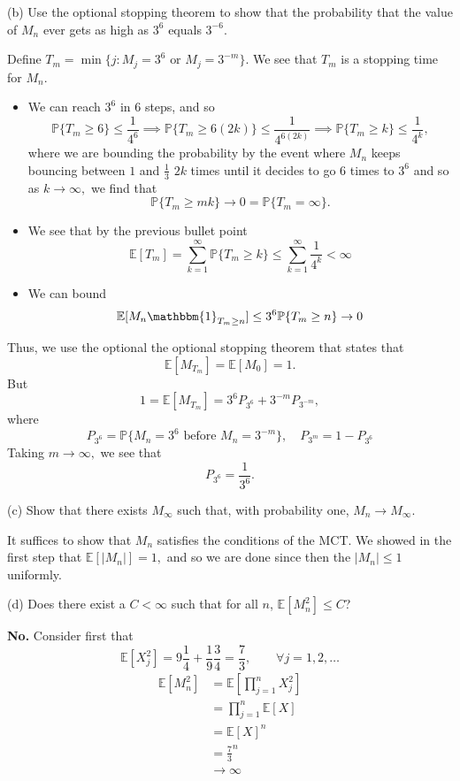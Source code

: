 \documentclass[11pt]{article}
\newcommand{\bbE}{\mathbb{E}}
\newcommand{\bbP}{\mathbb{P}}
\begin{document}
(b) Use the optional stopping theorem to show that the probability that the value of \(M_n\) ever gets as high as $3^6$ equals \(3^{-6}\).
\begin{solution}
    Define $T_m = \min\{j : M_j = 3^6 \text{ or } M_j = 3^{-m}\}.$ We see that $T_m$ is a stopping time for $M_n.$ 
    \begin{itemize}
        \item We can reach $3^6$ in $6$ steps, and so 
        \[\bbP\{T_m  \geq 6\} \leq \frac{1}{4^6}\implies \bbP\{T_m \geq 6(2k)\}\leq \frac{1}{4^{6(2k)}} \implies \bbP\{T_m \geq k\} \leq \frac{1}{4^k},\] where we are bounding the probability by the event where $M_n$ keeps bouncing  between $1$ and $\frac{1}{3}$ $2k$ times until it decides to go $6$ times to $3^6$ and so as $k\to \infty,$ we find that 
        \[\bbP\{T_m \geq mk\} \to 0 = \bbP\{T_m = \infty\}.\]
        \item We see that by the previous bullet point
        \[\bbE[T_m] =  \sum_{k=1}^\infty \bbP\{T_m \geq k\} \leq \sum_{k=1}^\infty \frac{1}{4^k} < \infty\]
        \item We can bound
        \[\bbE[M_n \mathbbm{1}_{T_m \geq n}] \leq 3^6 \bbP\{T_m \geq n\} \to 0\]
    \end{itemize}
    Thus, we use the optional the optional stopping theorem that states that 
    \[\bbE[M_{T_m}] = \bbE[M_0] = 1.\] But
    \[1 = \bbE[M_{T_m}]= 3^6 P_{3^6} + 3^{-m}P_{3^{-m}},\] where 
    \[P_{3^6} = \bbP\{M_n = 3^6 \text{ before }M_n = 3^{-m}\}, \quad P_{3^m} = 1-P_{3^6}\] Taking $m\to \infty,$ we see that 
    \[P_{3^6} = \frac{1}{3^6}.\]
\end{solution}

(c) Show that there exists \(M_\infty\) such that, with probability one, \(M_n \to M_\infty\).
\begin{solution}
It suffices to show that $M_n$ satisfies the conditions of the MCT. We showed in the first step that $\bbE[|M_n|]  = 1,$ and so we are done since then the $|M_n| \leq 1$ uniformly. 
\end{solution}

(d) Does there exist a \(C < \infty\) such that for all \(n\), \(\mathbb{E}[M_n^2] \leq C\)?
\begin{solution}
    \textbf{No.} Consider first that 
    \[\bbE[X_j^2] = 9 \frac{1}{4} + \frac{1}{9}\frac{3}{4}  = \frac{7}{3}, \qquad \forall j = 1,2,\dots\]
    \begin{align*}
        \bbE[M_n^2] &= \bbE\left[\prod_{j=1}^n X_j^2\right]\\
        &= \prod_{j=1}^n\bbE[X]\\
        &= \bbE[X]^n\\
        &=\frac{7}{3}^n\\
        &\to \infty
    \end{align*}
\end{solution}
\end{document}
